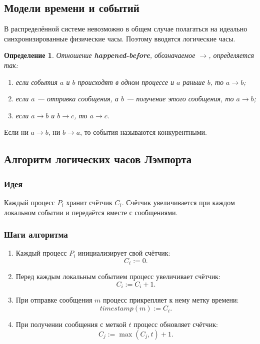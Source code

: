 \documentclass[12pt,a4paper]{article}
\newtheorem{definition}{Определение}
\begin{document}
\subsection{Модели времени и событий}

В распределённой системе невозможно в общем случае полагаться на идеально синхронизированные физические часы. Поэтому вводятся логические часы.

\begin{definition}
Отношение \textbf{happened-before}, обозначаемое $\rightarrow$, определяется так:
\begin{enumerate}
    \item если события $a$ и $b$ происходят в одном процессе и $a$ раньше $b$, то $a \rightarrow b$;
    \item если $a$ --- отправка сообщения, а $b$ --- получение этого сообщения, то $a \rightarrow b$;
    \item если $a \rightarrow b$ и $b \rightarrow c$, то $a \rightarrow c$.
\end{enumerate}
\end{definition}

Если ни $a \rightarrow b$, ни $b \rightarrow a$, то события называются конкурентными.

\subsection{Алгоритм логических часов Лэмпорта}

\subsubsection{Идея}

Каждый процесс $P_i$ хранит счётчик $C_i$. Счётчик увеличивается при каждом локальном событии и передаётся вместе с сообщениями.

\subsubsection{Шаги алгоритма}

\begin{enumerate}
    \item Каждый процесс $P_i$ инициализирует свой счётчик:
    \[
    C_i := 0.
    \]

    \item Перед каждым локальным событием процесс увеличивает счётчик:
    \[
    C_i := C_i + 1.
    \]

    \item При отправке сообщения $m$ процесс прикрепляет к нему метку времени:
    \[
    timestamp(m) := C_i.
    \]

    \item При получении сообщения с меткой $t$ процесс обновляет счётчик:
    \[
    C_j := \max(C_j,t)+1.
    \]
\end{enumerate}
\end{document}
